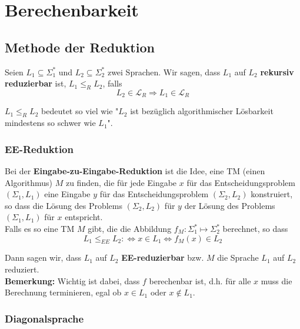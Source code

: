 \documentclass[11pt]{article}
\begin{document}
\section{Berechenbarkeit}

\subsection{Methode der Reduktion}

Seien $L_1 \subseteq \Sigma_1^*$ und $L_2 \subseteq \Sigma_2^*$ zwei Sprachen. Wir sagen, dass $L_1$ auf $L_2$ \textbf{rekursiv reduzierbar} ist, $L_1 \leq_R L_2$, falls
\begin{equation*}
	L_2 \in \mathcal{L}_R \Rightarrow L_1 \in \mathcal{L}_R
\end{equation*}

$L_1 \leq_R L_2$ bedeutet so viel wie "$L_2$ ist bez{\"u}glich algorithmischer L{\"o}sbarkeit mindestens so schwer wie $L_1$".

\subsubsection{EE-Reduktion}

Bei der \textbf{Eingabe-zu-Eingabe-Reduktion} ist die Idee, eine TM (einen Algorithmus) $M$ zu finden, die f{\"u}r jede Eingabe $x$ f{\"u}r das Entscheidungsproblem $(\Sigma_1,L_1)$ eine Eingabe $y$ f{\"u}r das Entscheidungsproblem $(\Sigma_2,L_2)$ konstruiert, so dass die L{\"o}sung des Problems $(\Sigma_2,L_2)$ f{\"u}r $y$ der L{\"o}sung des Problems $(\Sigma_1,L_1)$ f{\"u}r $x$ entspricht. \\

Falls es so eine TM $M$ gibt, die die Abbildung $f_M: \Sigma_1^*\mapsto\Sigma_2^*$ berechnet, so dass
\begin{equation*}
	L_1 \leq_{EE} L_2 :\Leftrightarrow x \in L_1 \Leftrightarrow f_M(x) \in L_2
\end{equation*}

Dann sagen wir, dass $L_1$ auf $L_2$ \textbf{EE-reduzierbar} bzw. $M$ die Sprache $L_1$ auf $L_2$ reduziert. \\

\textbf{Bemerkung:} Wichtig ist dabei, dass $f$ berechenbar ist, d.h. für alle $x$ muss die Berechnung terminieren, egal ob $x \in L_1$ oder $x \not\in L_1$.

\subsubsection{Diagonalsprache}
\end{document}
